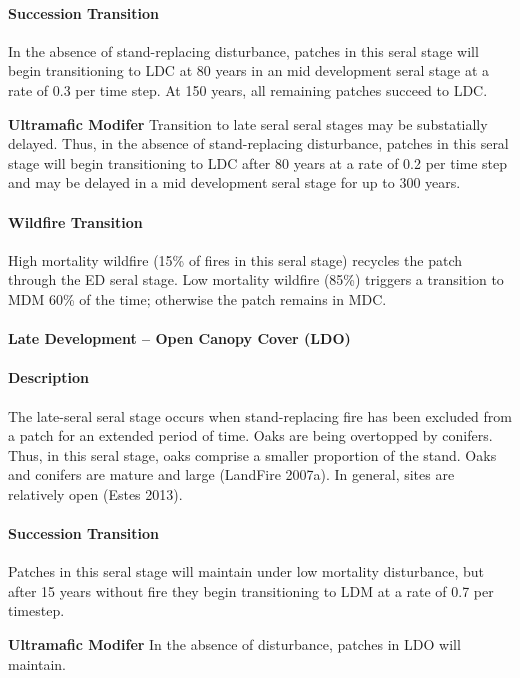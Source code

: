 \paragraph{Succession Transition} In the absence of stand-replacing disturbance, patches in this seral stage will begin transitioning to LDC at 80 years in an mid development seral stage at a rate of 0.3 per time step. At 150 years, all remaining patches succeed to LDC.
\begin{adjustwidth}{2cm}{}

\textbf{Ultramafic Modifer}  Transition to late seral seral stages may be substatially delayed. Thus, in the absence of stand-replacing disturbance, patches in this seral stage will begin transitioning to LDC after 80 years at a rate of 0.2 per time step and may be delayed in a mid development seral stage for up to 300 years.

\end{adjustwidth}
\paragraph{Wildfire Transition} High mortality wildfire (15\% of fires in this seral stage) recycles the patch through the ED seral stage. Low mortality wildfire (85\%) triggers a transition to MDM 60\% of the time; otherwise the patch remains in MDC.


\noindent\hrulefill


\paragraph{Late Development – Open Canopy Cover (LDO)}

\paragraph{Description} The late-seral seral stage occurs when stand-replacing fire has been excluded from a patch for an extended period of time. Oaks are being overtopped by conifers. Thus, in this seral stage, oaks comprise a smaller proportion of the stand. Oaks and conifers are mature and large (LandFire 2007a). In general, sites are relatively open (Estes 2013).

\paragraph{Succession Transition} Patches in this seral stage will maintain under low mortality disturbance, but after 15 years without fire they begin transitioning to LDM at a rate of 0.7 per timestep. 
\begin{adjustwidth}{2cm}{}

\textbf{Ultramafic Modifer}  In the absence of disturbance, patches in LDO will maintain.

\end{adjustwidth}
